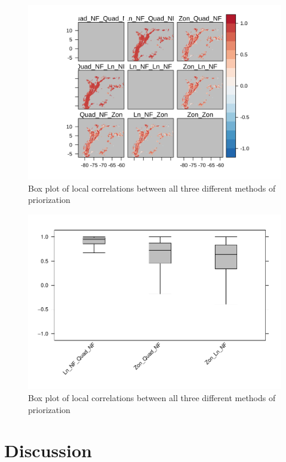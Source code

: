 \documentclass[]{article}
\begin{document}
\begin{figure}
\centering
\includegraphics{NFPaper_files/figure-latex/LocalCorr-1.png}
\caption{\label{fig:LocalCorr}Box plot of local correlations between all three different methods of priorization}
\end{figure}

\begin{figure}
\centering
\includegraphics{NFPaper_files/figure-latex/Boxplot-1.pdf}
\caption{\label{fig:Boxplot}Box plot of local correlations between all three different methods of priorization}
\end{figure}

\hypertarget{discussion}{%
\section{Discussion}\label{discussion}}
\end{document}

